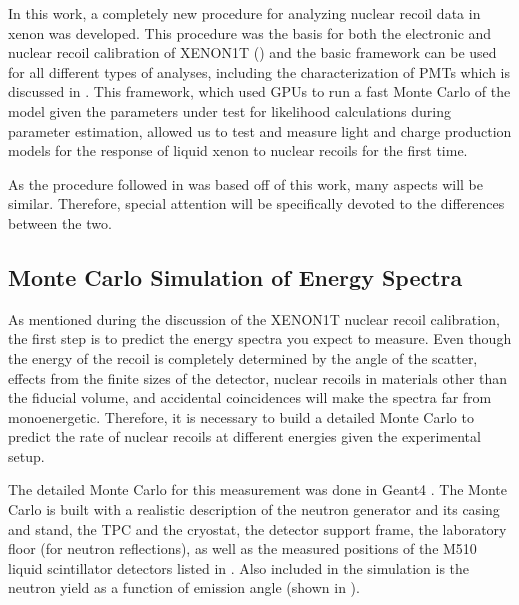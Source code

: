 In this work, a completely new procedure for analyzing nuclear recoil data in xenon was developed.  This procedure was the basis for both the electronic and nuclear recoil calibration of XENON1T () and the basic framework can be used for all different types of analyses, including the characterization of PMTs which is discussed in .  This framework, which used GPUs to run a fast Monte Carlo of the model given the parameters under test for likelihood calculations during parameter estimation, allowed us to test and measure light and charge production models for the response of liquid xenon to nuclear recoils for the first time.   

As the procedure followed in  was based off of this work, many aspects will be similar.  Therefore, special attention will be specifically devoted to the differences between the two.



\subsection{Monte Carlo Simulation of Energy Spectra}
\label{sec:nerix_geant_mc}


As mentioned during the discussion of the XENON1T nuclear recoil calibration, the first step is to predict the energy spectra you expect to measure.  Even though the energy of the recoil is completely determined by the angle of the scatter, effects from the finite sizes of the detector, nuclear recoils in materials other than the fiducial volume, and accidental coincidences will make the spectra far from monoenergetic.  Therefore, it is necessary to build a detailed Monte Carlo to predict the rate of nuclear recoils at different energies given the experimental setup.

The detailed Monte Carlo for this measurement was done in Geant4 \cite{agostinelli2003geant4}.  The Monte Carlo is built with a realistic description of the neutron generator and its casing and stand, the TPC and the cryostat, the detector support frame, the laboratory floor (for neutron reflections), as well as the measured positions of the M510 liquid scintillator detectors listed in .  Also included in the simulation is the neutron yield as a function of emission angle (shown in ).


